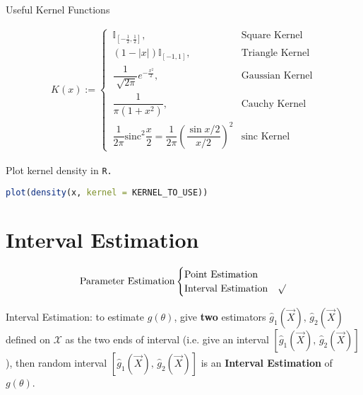     

\begin{point}
        Useful Kernel Functions
\end{point}

    
    \begin{align}
        K(x):=\begin{cases}
            \,\mathbb{I}_{[-\frac{1}{2},\frac{1}{2}]},&\text{Square Kernel}\\
            \,(1-|x|)\mathbb{I}_{[-1,1]},&\text{Triangle Kernel}\\
            \,\dfrac{1}{\sqrt[]{2\pi}}e^{-\frac{x^2}{2}},&\text{Gaussian Kernel}\\
            \,\dfrac{1}{\pi(1+x^2)},&\text{Cauchy Kernel}\\
            \,\dfrac{1}{2\pi}\mathrm{sinc}^2\dfrac{x}{2}=\dfrac{1}{2\pi}\left(\dfrac{\sin x/2}{x/2}\right)^2&\text{sinc Kernel}
        \end{cases} 
    \end{align}
    

\begin{rcode}
    Plot kernel density in \lstinline|R.| 
\begin{lstlisting}[language=R]
plot(density(x, kernel = KERNEL_TO_USE))
\end{lstlisting}
\end{rcode}






\section{Interval Estimation}\label{SectionIntervalEstimation}
\begin{equation}
    \text{Parameter Estimation}\begin{cases}
        \text{Point Estimation}& \\
        \text{Interval Estimation}& \surd
    \end{cases}    
\end{equation}

    Interval Estimation: to estimate $g(\theta)$, give \textbf{two} estimators $\hat{g}_1(\vec{X}),\, \hat{g}_2(\vec{X})$ defined on $\mathscr{X}$ as the two ends of interval (i.e. give an interval $[\hat{g}_1(\vec{X}),\, \hat{g}_2(\vec{X})]$), then random interval $[\hat{g}_1(\vec{X}),\, \hat{g}_2(\vec{X})]$ is an \textbf{Interval Estimation} of $g(\theta)$. 


